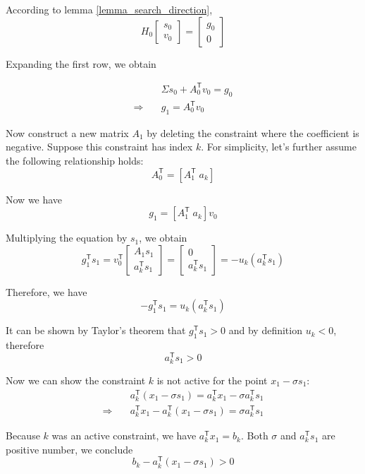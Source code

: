 \documentclass[letterpaper, oneside]{book}
\theoremstyle{definition}
\theoremstyle{remark}
\begin{document}
According to lemma \ref{lemma_search_direction}, 
\[
H_0	
\begin{bmatrix}
	s_0\\
	v_0
\end{bmatrix}
= 
\begin{bmatrix}
	g_0 \\
	0
\end{bmatrix}
\]

Expanding the first row, we obtain

\begin{align*}
	& \Sigma s_0 + A_0^{\mathsf{T}} v_0 = g_0 \\
	\Rightarrow \quad & g_1 = A_0^{\mathsf{T}} v_0
\end{align*}

Now construct a new matrix $A_1$ by deleting the constraint where the coefficient is negative. Suppose this constraint has index $k$. For simplicity, let's further assume the following relationship holds:
\[
	A_0^{\mathsf{T}} = [A_1^{\mathsf{T}} \; a_k]
\]

Now we have
\[
	g_1 = [A_1^{\mathsf{T}} \; a_k] v_0
\]

Multiplying the equation by $s_1$, we obtain
\[
	g_1^{\mathsf{T}} s_1 = v_0^{\mathsf{T}} 
	\begin{bmatrix}
		A_1 s_1\\
		a_k^{\mathsf{T}} s_1
	\end{bmatrix} = 
	\begin{bmatrix}
	0\\
	a_k^{\mathsf{T}} s_1
	\end{bmatrix}
	= -u_k(a_k^{\mathsf{T}} s_1)
\]

Therefore, we have 
\[
	-g_1^{\mathsf{T}} s_1 = u_k(a_k^{\mathsf{T}} s_1)
\]

It can be shown by Taylor's theorem that $g_1^{\mathsf{T}} s_1 > 0$ and by definition $u_k < 0$, therefore 
\[
	a_k^{\mathsf{T}}s_1 > 0
\]

Now we can show the constraint $k$ is not active for the point $x_1 - \sigma  s_1$:
\begin{align*}
& a_k^{\mathsf{T}} (x_1 - \sigma s_1) = a_k^{\mathsf{T}} x_ 1 - \sigma a_k^{\mathsf{T}}s_1 \\
\Rightarrow \quad & a_k^{\mathsf{T}} x_ 1 - a_k^{\mathsf{T}} (x_1 - \sigma s_1) = \sigma a_k^{\mathsf{T}}s_1 
\end{align*}

Because $k$ was an active constraint, we have $a_k^{\mathsf{T}} x_ 1 = b_k$. Both $\sigma$ and $a_k^{\mathsf{T}}s_1$ are positive number, we conclude
\[
b_k - a_k^{\mathsf{T}} (x_1 - \sigma s_1) > 0
\]
\end{document}
